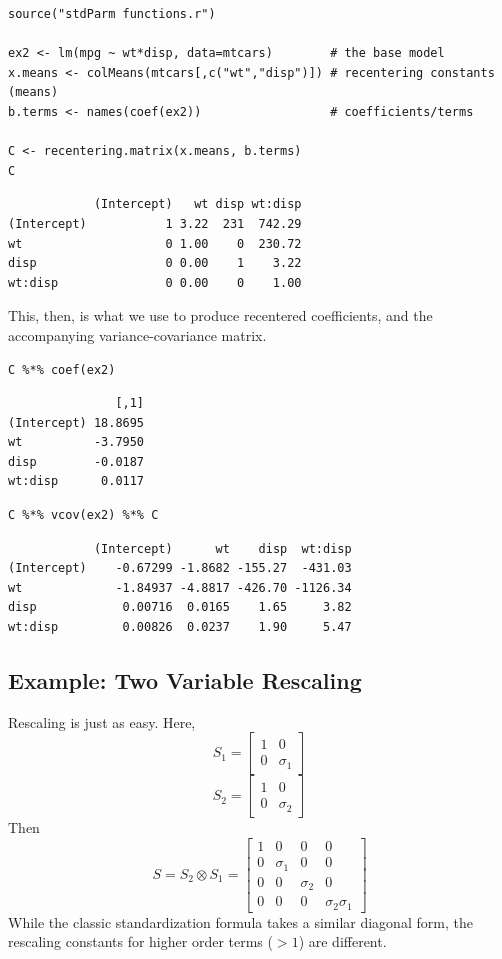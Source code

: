 \documentclass[]{article}
\begin{document}
\begin{verbatim}
source("stdParm functions.r")

ex2 <- lm(mpg ~ wt*disp, data=mtcars)        # the base model
x.means <- colMeans(mtcars[,c("wt","disp")]) # recentering constants (means)
b.terms <- names(coef(ex2))                  # coefficients/terms

C <- recentering.matrix(x.means, b.terms)
C
\end{verbatim}

\begin{verbatim}
            (Intercept)   wt disp wt:disp
(Intercept)           1 3.22  231  742.29
wt                    0 1.00    0  230.72
disp                  0 0.00    1    3.22
wt:disp               0 0.00    0    1.00
\end{verbatim}

This, then, is what we use to produce recentered coefficients, and the
accompanying variance-covariance matrix.

\begin{verbatim}
C %*% coef(ex2)
\end{verbatim}

\begin{verbatim}
               [,1]
(Intercept) 18.8695
wt          -3.7950
disp        -0.0187
wt:disp      0.0117
\end{verbatim}

\begin{verbatim}
C %*% vcov(ex2) %*% C
\end{verbatim}

\begin{verbatim}
            (Intercept)      wt    disp  wt:disp
(Intercept)    -0.67299 -1.8682 -155.27  -431.03
wt             -1.84937 -4.8817 -426.70 -1126.34
disp            0.00716  0.0165    1.65     3.82
wt:disp         0.00826  0.0237    1.90     5.47
\end{verbatim}

\hypertarget{example-two-variable-rescaling}{%
\subsection{Example: Two Variable
Rescaling}\label{example-two-variable-rescaling}}

Rescaling is just as easy. Here,
\[S_1=\begin{bmatrix}1 &0 \\ 0 &\sigma_1 \end{bmatrix}\]
\[S_2=\begin{bmatrix}1 &0 \\ 0 &\sigma_2 \end{bmatrix}\] Then
\[S = S_2 \otimes S_1 = \begin{bmatrix} 1 &0 &0 &0 \\
  0 &\sigma_1 &0 &0 \\ 0 &0 &\sigma_2 &0 \\ 0 &0 &0 &\sigma_2\sigma_1 \end{bmatrix}\]
While the classic standardization formula takes a similar diagonal form,
the rescaling constants for higher order terms (\(>1\)) are different.
\end{document}
